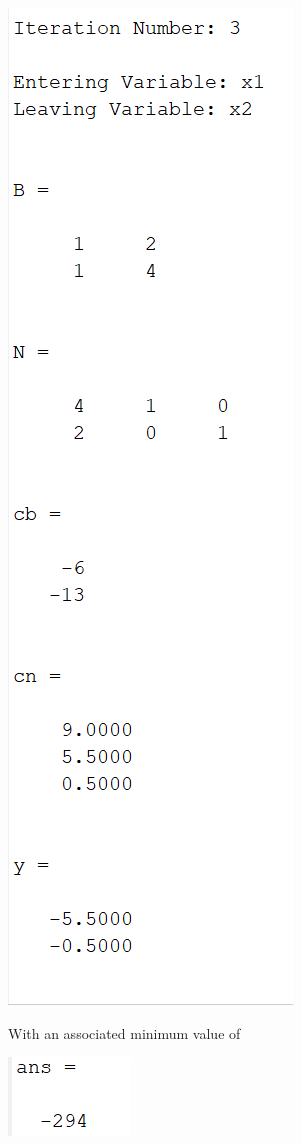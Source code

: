\documentclass{article}
\begin{document}
\begin{itemize}
\begin{itemize}
\begin{center}
            \includegraphics[scale = 0.65]{iteration3Prob1}
        \end{center}
        With an associated minimum value of
        \begin{center}
            \includegraphics{ansProb1}
        \end{center}
        

\end{itemize}
\end{itemize}
\end{document}
